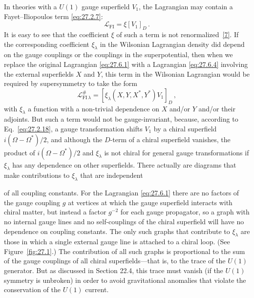 In theories with a \(U(1)\) gauge superfield \(V_1\), the Lagrangian may
contain a Fayet--Iliopoulos term \eqref{eq:27.2.7}:
\begin{equation}
  \mathcal{L}_{\mathrm{FI}}=\xi[V_1]_D\,.
  \tag{27.6.15}\label{eq:27.6.15}
\end{equation}
It is easy to see that the coefficient \(\xi\) of such a term is not
renormalized~\hyperref[ch27-ref-7]{[7]}. If the corresponding coefficient
\(\xi_\lambda\) in the Wilsonian Lagrangian density did depend on the gauge
couplings or the couplings in the superpotential, then when we replace the
original Lagrangian \eqref{eq:27.6.1} with a Lagrangian
\eqref{eq:27.6.4} involving the external superfields \(X\) and \(Y\), this
term in the Wilsonian Lagrangian would be required by supersymmetry to take
the form
\begin{equation}
  \mathcal{L}^{\#}_{\mathrm{FI}\,\lambda}
  =
  \left[
    \xi_\lambda(X,Y,X^*,Y^*)V_1
  \right]_D\,,
  \tag{27.6.16}\label{eq:27.6.16}
\end{equation}
with \(\xi_\lambda\) a function with a non-trivial dependence on \(X\)
and/or \(Y\) and/or their adjoints. But such a term would not be
gauge-invariant, because, according to Eq.~\eqref{eq:27.2.18}, a gauge
transformation shifts \(V_1\) by a chiral superfield
\(i(\Omega-\Omega^*)/2\), and although the \(D\)-term of a chiral superfield
vanishes, the product of \(i(\Omega-\Omega^*)/2\) and \(\xi_\lambda\) is not
chiral for general gauge transformations if \(\xi_\lambda\) has any
dependence on other superfields. There actually are diagrams that make
contributions to \(\xi_\lambda\) that are independent


of all coupling constants. For the Lagrangian \eqref{eq:27.6.1} there are no
factors of the gauge
coupling \(g\) at vertices at which the gauge superfield interacts with
chiral matter, but instead a factor \(g^{-2}\) for each gauge propagator, so
a graph with no internal gauge lines and no self-couplings of the chiral
superfield will have no dependence on coupling constants. The only such
graphs that contribute to \(\xi_\lambda\) are those in which a single
external gauge line is attached to a chiral loop. (See Figure~\ref{fig:27.1}.)
The contribution of all such graphs is proportional to the sum of the gauge
couplings of all chiral superfields---that is, to the trace of the \(U(1)\)
generator. But as discussed in Section 22.4, this trace must vanish (if the
\(U(1)\) symmetry is unbroken) in order to avoid gravitational anomalies
that violate the conservation of the \(U(1)\) current.


